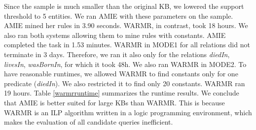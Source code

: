 
Since the sample is much smaller than the original KB, we lowered the support threshold to 5 entities. We ran AMIE with these parameters on the sample. AMIE mined her rules in 3.90 seconds.
WARMR, in contrast, took 18 hours. 
We also ran both systems allowing them to mine rules with constants. AMIE completed the task in 1.53 minutes. WARMR in MODE1 for all relations did not terminate in 3 days. 
Therefore, we ran it also only for the relations \textit{diedIn}, \textit{livesIn}, \textit{wasBornIn}, for which it took 48h. We also ran WARMR in MODE2.
To have reasonable runtimes, we allowed WARMR to find constants only for one predicate (\emph{diedIn}). We also restricted it to find only 20 constants. WARMR ran 19 hours. 
Table \ref{warmrruntime} summarizes the runtime results. We conclude that AMIE is better suited for large KBs than WARMR. 
This is because WARMR is an ILP algorithm written in a logic programming environment, which makes the evaluation of all candidate queries inefficient.\\


